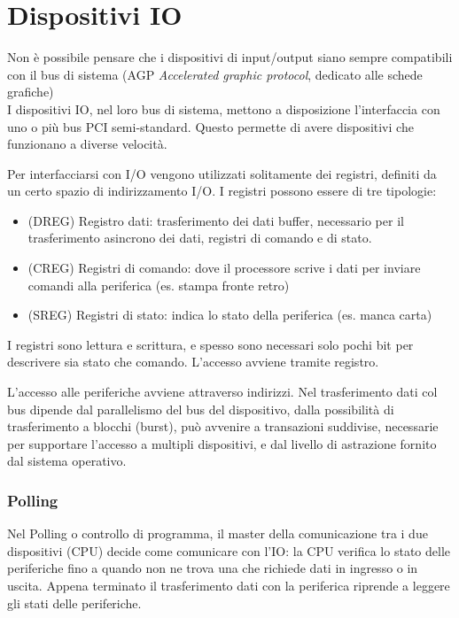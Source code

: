 \documentclass[../template]{subfiles}
\begin{document}
\section{Dispositivi IO}
Non è possibile pensare che i dispositivi di input/output siano sempre compatibili con il bus di sistema (AGP \textit{Accelerated graphic protocol}, dedicato alle schede grafiche)
\\
I dispositivi IO, nel loro bus di sistema, mettono a disposizione l'interfaccia con uno o più bus PCI semi-standard. Questo permette di avere dispositivi che funzionano a diverse velocità.

Per interfacciarsi con I/O vengono utilizzati solitamente dei registri, definiti da un certo spazio di indirizzamento I/O. I registri possono essere di tre tipologie:
\begin{itemize}
    \item (DREG) Registro dati:  trasferimento dei dati buffer, necessario per il trasferimento asincrono dei dati, registri di comando e di stato.
    \item (CREG) Registri di comando: dove il processore scrive i dati per inviare comandi alla periferica (es. stampa fronte retro)
    \item (SREG) Registri di stato: indica lo stato della periferica (es. manca carta)
\end{itemize}

I registri sono lettura e scrittura, e spesso sono necessari solo pochi bit per descrivere sia stato che comando. L'accesso avviene tramite registro.

L'accesso alle periferiche avviene attraverso indirizzi. Nel trasferimento dati col bus dipende dal parallelismo del bus del dispositivo, dalla possibilità di trasferimento a blocchi (burst), può avvenire a transazioni suddivise, necessarie per supportare l'accesso a multipli dispositivi, e dal livello di astrazione fornito dal sistema operativo.

\subsubsection{Polling}
Nel Polling o controllo di programma, il master della comunicazione tra i due dispositivi (CPU) decide come comunicare con l'IO: la CPU verifica lo stato delle periferiche fino a quando non ne trova una che richiede dati in ingresso o in uscita. Appena terminato il trasferimento dati con la periferica riprende a leggere gli stati delle periferiche.
\end{document}
